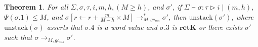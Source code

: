 \documentclass[fleqn]{article}
\newtheorem{theorem}{Theorem}
\begin{document}
\begin{theorem}
	For all $\Sigma,\sigma,\tau,i,m,h,(M \ge h)$, and $\sigma'$, if $\Sigma \vdash \sigma : \tau \triangleright i \mid (m,h)$, $\Psi(\sigma.1) \le M$, and $\sigma[r \leftarrow r+ \frac{m}{M-h}\times M] \longrightarrow_{M,gc_{ms}}^* \sigma'$,
	then $\mathrm{unstack}(\sigma')$, where $\mathrm{unstack}(\sigma)$ asserts that $\sigma.4$ is a word value and $\sigma.3$ is $\mathbf{retK}$ or there exists $\sigma'$ such that $\sigma \longrightarrow_{M,gc_{ms}} \sigma'$.
\end{theorem}
\end{document}
